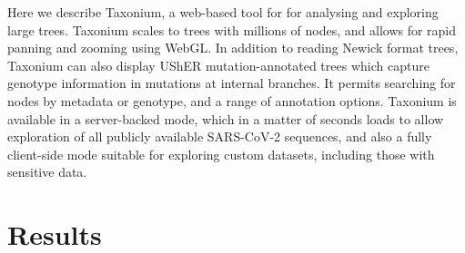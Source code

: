 Here we describe Taxonium, a web-based tool for for analysing and exploring large trees. Taxonium scales to trees with millions of nodes, and allows for rapid panning and zooming using WebGL. In addition to reading Newick format trees, Taxonium can also display UShER mutation-annotated trees which capture genotype information in mutations at internal branches. It permits searching for nodes by metadata or genotype, and a range of annotation options. Taxonium is available in a server-backed mode, which in a matter of seconds loads to allow exploration of all publicly available SARS-CoV-2 sequences, and also a fully client-side mode suitable for exploring custom datasets, including those with sensitive data.


\section*{Results}\label{s:results}

